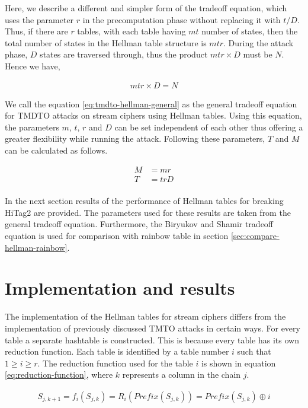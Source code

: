 Here, we describe a different and simpler form of the tradeoff equation, which uses the parameter $r$ in the precomputation phase without replacing it with $t/D$. Thus, if there are $r$ tables, with each table having $mt$ number of states, then the total number of states in the Hellman table structure is $mtr$. During the attack phase, $D$ states are traversed through, thus the product $mtr \times D$ must be $N$. Hence we have, 

\begin{align}
\label{eq:tmdto-hellman-general} mtr \times D = N
\end{align}

We call the equation \ref{eq:tmdto-hellman-general} as the general tradeoff equation for TMDTO attacks on stream ciphers using Hellman tables. Using this equation, the parameters $m$, $t$, $r$ and $D$ can be set independent of each other thus offering a greater flexibility while running the attack. Following these parameters, $T$ and $M$ can be calculated as follows.

\begin{align}
\label{eq:tmdto-hellman-general-memory} M &= mr\\
\label {eq:tmdto-hellman-general-time} T &= trD
\end{align}
 \\
In the next section results of the performance of Hellman tables for breaking HiTag2 are provided. The parameters used for these results are taken from the general tradeoff equation. Furthermore, the Biryukov and Shamir tradeoff equation is used for comparison with rainbow table in section \ref{sec:compare-hellman-rainbow}.

\section{Implementation and results}
\label{sec:hellman-table-impl}

The implementation of the Hellman tables for stream ciphers differs from the implementation of previously discussed TMTO attacks in certain ways. For every table a separate hashtable is constructed. This is because every table has its own reduction function. Each table is identified by a table number $i$ such that $1 \geq i \geq r$. The reduction function used for the table $i$ is shown in equation \ref{eq:reduction-function}, where $k$ represents a column in the chain $j$.

\begin{align}
\label{eq:reduction-function} S_{j,k+1} = f_i(S_{j,k}) = R_i(Prefix(S_{j,k})) = Prefix(S_{j,k}) \oplus i
\end{align}  


